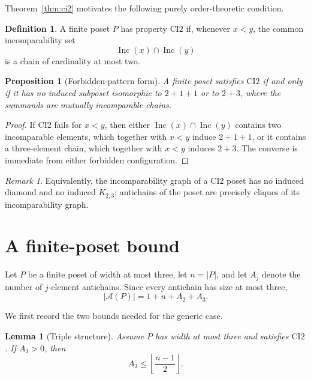 \documentclass[11pt]{article}
\numberwithin{equation}{section}
\newtheorem{lemma}[theorem]{Lemma}
\newtheorem{proposition}[theorem]{Proposition}
\theoremstyle{definition}
\newtheorem{definition}[theorem]{Definition}
\theoremstyle{remark}
\newtheorem{remark}[theorem]{Remark}
\newcommand{\Inc}{\operatorname{Inc}}
\newcommand{\A}{\mathcal A}
\begin{document}
Theorem~\ref{thm:ci2} motivates the following purely order-theoretic
condition.

\begin{definition}\label{def:ci2}
A finite poset $P$ has property $\mathrm{CI2}$ if, whenever $x<y$,
the common incomparability set
\[
        \Inc(x)\cap\Inc(y)
\]
is a chain of cardinality at most two.
\end{definition}

\begin{proposition}[Forbidden-pattern form]\label{prop:forbidden}
A finite poset satisfies $\mathrm{CI2}$ if and only if it has no induced
subposet isomorphic to $2+1+1$ or to $2+3$, where the summands are mutually
incomparable chains.
\end{proposition}

\begin{proof}
If $\mathrm{CI2}$ fails for $x<y$, then either
$\Inc(x)\cap\Inc(y)$ contains two incomparable elements, which together
with $x<y$ induce $2+1+1$, or it contains a three-element chain, which
together with $x<y$ induces $2+3$.  The converse is immediate from either
forbidden configuration.
\end{proof}

\begin{remark}\label{rem:graph-ci2}
Equivalently, the incomparability graph of a $\mathrm{CI2}$ poset has no
induced diamond and no induced $K_{2,3}$; antichains of the poset are
precisely cliques of its incomparability graph.
\end{remark}

\section{A finite-poset bound}

Let $P$ be a finite poset of width at most three, let $n=|P|$, and let
$A_j$ denote the number of $j$-element antichains.  Since every antichain
has size at most three,
\begin{equation}\label{eq:antichain-decomposition}
|\A(P)|=1+n+A_2+A_3.
\end{equation}

We first record the two bounds needed for the generic case.

\begin{lemma}[Triple structure]\label{lem:triple}
Assume $P$ has width at most three and satisfies $\mathrm{CI2}$.  If
$A_3>0$, then
\[
        A_3\le \left\lfloor\frac{n-1}{2}\right\rfloor.
\]
\end{lemma}
\end{document}
